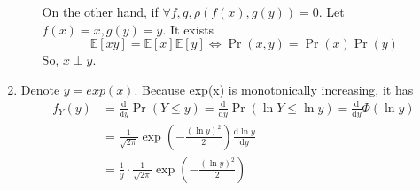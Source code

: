\documentclass[a4paper]{article}
\begin{document}
\begin{enumerate}
\begin{enumerate}
      On the other hand, if $\forall f,g,\rho(f(x),g(y))=0$. Let $f(x)=x,g(y)=y$. It exists
      \begin{equation*}
      \mathbb{E}[xy]=\mathbb{E}[x]\mathbb{E}[y] \Longleftrightarrow \Pr(x,y)=\Pr(x)\Pr(y)
      \end{equation*}
      So, $x \perp y$.
  \end{enumerate}
  \item Denote $y=exp(x)$. Because exp(x) is monotonically increasing, it has
  \begin{equation*}
      \begin{aligned} f_{Y}(y) &=\frac{\mathrm{d}}{\mathrm{d} y} \operatorname{Pr}(Y \leq y)=\frac{\mathrm{d}}{\mathrm{d} y} \operatorname{Pr}(\ln Y \leq \ln y)=\frac{\mathrm{d}}{\mathrm{d} y} \Phi\left(\ln y\right) 
      \\ &=\frac{1}{\sqrt{2 \pi}} \exp \left(-\frac{(\ln y)^{2}}{2}\right) \frac{\mathrm{d} \ln y}{\mathrm{d} y}
      \\ &=\frac{1}{y} \cdot \frac{1}{\sqrt{2 \pi}} \exp \left(-\frac{(\ln y)^{2}}{2}\right) \end{aligned}
  \end{equation*}


%   
%   
    
\end{enumerate}
  
  
%   
  
\end{document}
